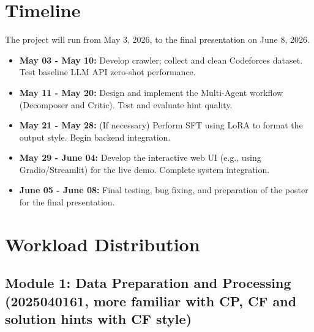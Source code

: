 \documentclass{article}
\begin{document}
\section{Timeline}
The project will run from May 3, 2026, to the final presentation on June 8, 2026.
\begin{itemize}
    \item \textbf{May 03 - May 10:} Develop crawler; collect and clean Codeforces dataset. Test baseline LLM API zero-shot performance.
    \item \textbf{May 11 - May 20:} Design and implement the Multi-Agent workflow (Decomposer and Critic). Test and evaluate hint quality.
    \item \textbf{May 21 - May 28:} (If necessary) Perform SFT using LoRA to format the output style. Begin backend integration.
    \item \textbf{May 29 - June 04:} Develop the interactive web UI (e.g., using Gradio/Streamlit) for the live demo. Complete system integration.
    \item \textbf{June 05 - June 08:} Final testing, bug fixing, and preparation of the poster for the final presentation.
\end{itemize}

\section{Workload Distribution}



\subsection*{Module 1: Data Preparation and Processing (2025040161, more familiar with CP, CF and solution hints with CF style)}
\end{document}
